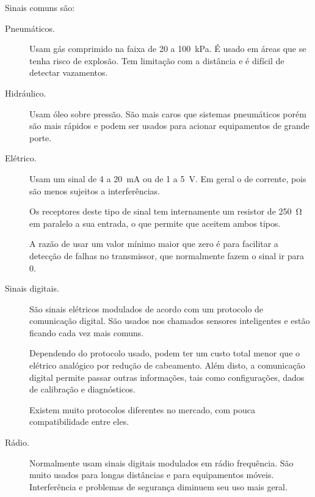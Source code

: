 Sinais comuns são:
\begin{description}
  \item[Pneumáticos.] Usam gás comprimido na faixa de 20 a \SI{100}{\kilo\pascal}. É usado em áreas que se tenha risco de explosão. Tem limitação com a distância e é difícil de detectar vazamentos.

  \item[Hidráulico.] Usam óleo sobre pressão. São mais caros que sistemas pneumáticos porém são mais rápidos e podem ser usados para acionar equipamentos de grande porte.
  \item[Elétrico.] Usam um sinal de 4 a \SI{20}{mA} ou de 1 a \SI{5}{\volt}. Em geral o de corrente, pois são menos sujeitos a interferências.

  Os receptores deste tipo de sinal tem internamente um resistor de \SI{250}{\ohm} em paralelo a sua entrada, o que permite que aceitem ambos tipos.

  A razão de usar um valor mínimo maior que zero é para facilitar a detecção de falhas no transmissor, que normalmente fazem o sinal ir para 0.

  \item[Sinais digitais.] São sinais elétricos modulados de acordo com um protocolo de comunicação digital. São usados nos chamados sensores inteligentes e estão ficando cada vez mais comuns.

  Dependendo do protocolo usado, podem ter um custo total menor que o elétrico analógico por redução de cabeamento. Além disto, a comunicação digital permite passar outras informações, tais como configurações, dados de calibração e diagnósticos.

  Existem muito protocolos diferentes no mercado, com pouca compatibilidade entre eles.

  \item[Rádio.] Normalmente usam sinais digitais modulados em rádio frequência. São muito usados para longas distâncias e para equipamentos móveis. Interferência e problemas de segurança diminuem seu uso mais geral.
\end{description}
